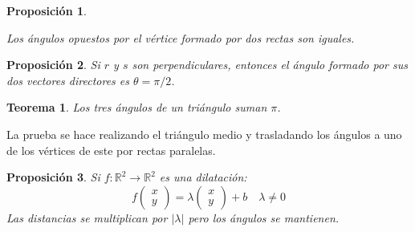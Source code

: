 \documentclass[11pt, a4paper]{article}
\makeatletter
\newif\IfInSansMode
\let\oldsf\sffamily
\renewcommand*{\sffamily}{\oldsf\mathversion{sans}\InSansModetrue}
\let\oldnorm\normalfont
\renewcommand*{\normalfont}{\oldnorm\InSansModefalse\mathversion{normal}}
\renewenvironment{proof}[1][\proofname] {\vspace{-15pt}\par\pushQED{\qed}\normalfont\topsep6\p@\@plus6\p@\relax\trivlist\item[\hskip\labelsep\it#1\@addpunct{.}]\ignorespaces}{\popQED\endtrivlist\@endpefalse}
\newcommand{\R}{\mathbb{R}}
\renewenvironment{proof}[1][\proofname] {\par\pushQED{\qed}\normalfont\topsep6\p@\@plus6\p@\relax\trivlist\item[\hskip\labelsep\itshape\sffamily#1\@addpunct{.}]\ignorespaces}{\popQED\endtrivlist\@endpefalse}
\theoremstyle{theorem-style}
\newtheorem{nth}{Teorema}[section]
\newtheorem{nprop}{Proposición}[section]
\theoremstyle{definition-style}
\theoremstyle{remark-style}
\theoremstyle{example-style}
\makeatother
\begin{document}
\begin{nprop}\hfill\\
  \begin{minipage}[c]{0.65\textwidth}
    Los ángulos opuestos por el vértice formado por dos rectas son iguales.
  \end{minipage}\hfill
  \begin{minipage}{0.30\textwidth}

  \end{minipage}
\end{nprop}

 

\begin{nprop}
  Si $r$ y $s$ son perpendiculares, entonces el ángulo formado por sus dos vectores directores es $\theta = \pi/2$.
\end{nprop}

\begin{nth}
  Los tres ángulos de un triángulo suman $\pi$.
\end{nth}
\begin{proof}
  La prueba se hace realizando el triángulo medio y trasladando los ángulos a uno de los vértices de este por rectas paralelas.
\end{proof}

\begin{nprop}
  Si $f:\R^2 \to \R^2$ es una dilatación:
  \[
    f \begin{pmatrix}
      x\\
      y 
    \end{pmatrix} = \lambda\begin{pmatrix}
      x\\
      y 
    \end{pmatrix} + b \quad \lambda \ne 0
  \]
  Las distancias se multiplican por $|\lambda|$ pero los ángulos se mantienen.
\end{nprop}
\end{document}
